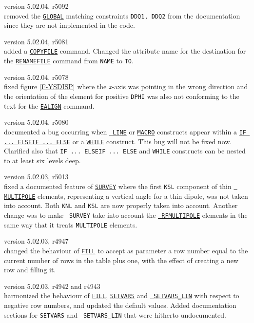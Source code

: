 \begin{madlist}
  
   version 5.02.04, r5092\\
  removed the \hyperref[sec:global]{\tt GLOBAL} matching constraints {\tt DDQ1, 
  	DDQ2} from the documentation since they are not implemented in the code. 
  
  
   version 5.02.04, r5081\\
  added a \hyperref[sec:copyfile]{\tt COPYFILE} command. Changed the attribute 
  name for the destination for the \hyperref[sec:renamefile]{\tt RENAMEFILE} 
  command from {\tt NAME} to {\tt TO}.
  
  
   version 5.02.04, r5078\\
  fixed figure \ref{F-YSDISP} where the {\it x}-axis was pointing in
  the wrong direction and the orientation of the element for positive
  {\tt DPHI} was also not conforming to the text for the
  \hyperref[sec:ealign]{\tt EALIGN} command.
  
  
    version 5.02.04, r5080\\
  documented a bug occurring when \hyperref[sec:line]{\tt 
  LINE} or \hyperref[sec:macro]{\tt MACRO} 
  constructs appear within a \hyperref[sec:if]{\tt IF ... ELSEIF ... ELSE} or a 
  \hyperref[sec:while]{\tt WHILE} construct. This bug will not be fixed now. \\ 
  Clarified also that {\tt IF ... ELSEIF ... ELSE} and {\tt WHILE} constructs 
  can be nested to at least six levels deep.
  
  
   version 5.02.03, r5013\\
  fixed a documented feature of \hyperref[chap:survey]{\tt SURVEY} where
  the first {\tt KSL} component of thin \hyperref[sec:multipole]{\tt
  	MULTIPOLE} elements, representing a vertical angle for a thin
  dipole, was not taken into account. Both {\tt KNL} and {\tt KSL} are
  now properly taken into account. Another change was to make {\tt
  	SURVEY} take into account the \hyperref[sec:rfmultipole]{\tt
  	RFMULTIPOLE} elements in the same way that it treats {\tt MULTIPOLE}
  elements.
  
  
   version 5.02.03, r4947 \\
  changed the behaviour of \hyperref[sec:fill]{\tt FILL} to accept as
  parameter a row number equal to the current number of rows in the
  table plus one, with the effect of creating a new row and filling it. 
  
  
   version 5.02.03, r4942 and r4943\\
  harmonized the behaviour of \hyperref[sec:fill]{\tt FILL},
  \hyperref[sec:setvars]{\tt SETVARS} and \hyperref[sec:setvars_lin]{\tt
  	SETVARS\_LIN} with respect to negative row numbers, and updated the
  default values. Added documentation sections for {\tt SETVARS} and {\tt
  	SETVARS\_LIN} that were hitherto undocumented.  
  

\end{madlist}
